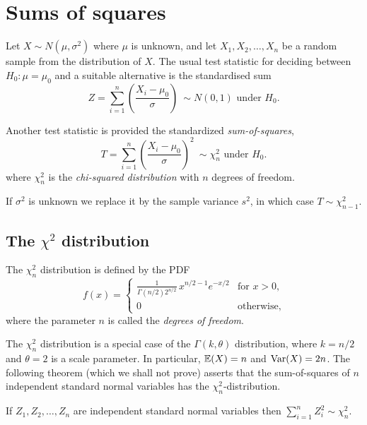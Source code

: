 
\section{Sums of squares}\label{sec:chi-squared}

Let $X\sim N(\mu,\sigma^2)$ where $\mu$ is unknown, and let $X_1,X_2,\ldots,X_n$ be a random sample from the distribution of $X$. The usual test statistic for deciding between $H_0:\mu=\mu_0$ and a suitable alternative is the standardised sum
\[
Z = \sum_{i=1}^n\left(\frac{X_i-\mu_0}{\sigma}\right)\ \sim N(0,1)\text{ under $H_0$.}
\]

Another test statistic is provided the standardized \emph{sum-of-squares},
\[
T = \sum_{i=1}^n\left(\frac{X_i-\mu_0}{\sigma}\right)^2\ \sim\chi^2_n \text{ under $H_0$.}
\]
where $\chi^2_n$ is the \emph{chi-squared distribution} with $n$ degrees of freedom.
\begin{remark}
If $\sigma^2$ is unknown we replace it by the sample variance $s^2$, in which case $T\sim\chi^2_{n-1}$.
\end{remark}
\subsection{The $\chi^2$ distribution}

\begin{definition}\label{defn:chisquared_dist}
The $\chi^2_{n}$ distribution is defined by the PDF
\[
f(x) = \begin{cases}
	\displaystyle\frac{1}{\Gamma(n/2)2^{n/2}}\,x^{n/2-1} e^{-x/2} & \text{for $x>0$}, \\
	0																	& \text{otherwise,}
\end{cases}
\]
where the parameter $n$ is called the \emph{degrees of freedom}.
\end{definition}
The $\chi^2_{n}$ distribution is a special case of the $\Gamma(k,\theta)$ distribution, where $k=n/2$ and $\theta=2$ is a scale parameter. In particular, $\mathbb{E}(X) = n$ and $\text{Var}(X)=2n$.
%
The following theorem (which we shall not prove) asserts that the sum-of-squares of $n$ independent standard normal variables has the $\chi^2_n$-distribution.
\begin{theorem}
If $Z_1,Z_2,\ldots,Z_n$ are independent standard normal variables then $\displaystyle\sum_{i=1}^n Z_i^2\sim\chi^2_n$.
\end{theorem}

